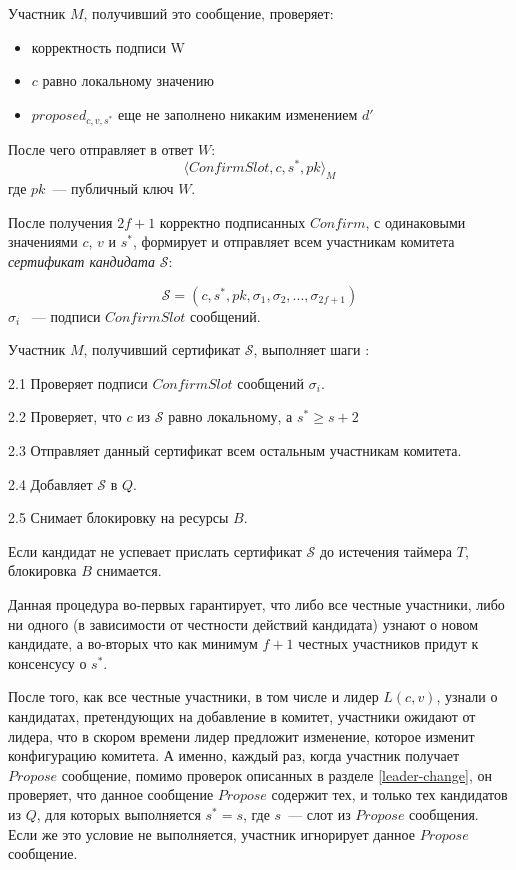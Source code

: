 \noindent Участник $M$, получивший это сообщение, проверяет:
\begin{itemize}
\item корректность подписи W
\item $c$ равно локальному значению
\item $proposed_{c, v, s^{*}}$ еще не заполнено никаким изменением $d'$
\end{itemize} 
После чего отправляет в ответ $W$:
 \[ \langle ConfirmSlot, c, s^{*}, pk \rangle_M \]
где $pk$~--- публичный ключ $W$.
\vspace{10pt}

После получения $2f+1$ корректно подписанных $Confirm$, с одинаковыми значениями $c$, $v$ и $s^{*}$,
формирует и отправляет всем участникам комитета \textit{сертификат кандидата} $\mathcal{S}$:

$$\mathcal{S}=(c, s^{*}, pk, \sigma_1, \sigma_2,..., \sigma_{2f+1})$$
$\sigma_i$ ~--- подписи $ConfirmSlot$ сообщений.
\vspace{10pt}

Участник $M$, получивший сертификат $\mathcal{S}$, выполняет шаги : 

2.1 Проверяет подписи $ConfirmSlot$ сообщений $\sigma_i$.

2.2 Проверяет, что $c$ из $\mathcal{S}$ равно локальному, а $s^{*} \ge s + 2$

2.3 Отправляет данный сертификат всем остальным участникам комитета.

2.4 Добавляет $\mathcal{S}$ в $Q$.

2.5 Снимает блокировку на ресурсы $B$.

Если кандидат не успевает прислать сертификат $\mathcal{S}$ до истечения таймера $T$, блокировка $B$ снимается.

Данная процедура во-первых гарантирует, что либо все честные участники, либо ни одного (в зависимости от честности действий кандидата) узнают о новом кандидате, а во-вторых что как минимум $f+1$ честных участников придут к консенсусу о $s^{*}$.

После того, как все честные участники, в том числе и лидер $L(c, v)$, узнали о кандидатах, претендующих на добавление в комитет, участники ожидают от лидера, что в скором времени лидер предложит изменение, которое изменит конфигурацию комитета. А именно, каждый раз, когда участник получает $Propose$ сообщение, помимо проверок описанных в  разделе \ref{leader-change}, он проверяет, что данное сообщение $Propose$ содержит тех, и только тех кандидатов из $Q$, для которых выполняется $s^{*} = s$, где $s$~--- слот из $Propose$ сообщения. Если же это условие не выполняется, участник игнорирует данное $Propose$ сообщение.

